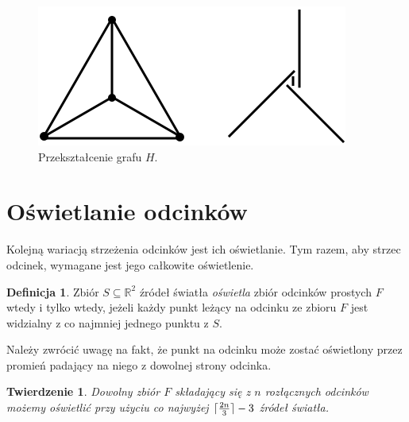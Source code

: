 \documentclass{xmgr}
\DeclarePairedDelimiter\ceil{\lceil}{\rceil}
\newtheorem{Twierdzenie}{Twierdzenie}
\theoremstyle{definition}
\newtheorem{Definicja}{Definicja}
\begin{document}
\begin{figure}[ht!]
 \centering
  \includegraphics{rysunki/dolna_granica.png}
  \caption{Przekształcenie grafu $H$.}
  \label{fig:przeksztalcenie h}
\end{figure} 

\section{Oświetlanie odcinków}\label{oświetlanie odcinków}
Kolejną wariacją strzeżenia odcinków jest ich oświetlanie. Tym razem, aby strzec odcinek, wymagane jest jego całkowite oświetlenie.
\begin{Definicja}
	Zbiór $S \subseteq \mathbb{R}^2$ źródeł światła \emph{oświetla} zbiór odcinków prostych $F$ wtedy i tylko wtedy, jeżeli każdy punkt leżący na odcinku ze zbioru $F$ jest widzialny z co najmniej jednego punktu z $S$.
\end{Definicja} Należy zwrócić uwagę na fakt, że punkt na odcinku może zostać oświetlony przez promień padający na niego z dowolnej strony odcinka.

\begin{Twierdzenie} \cite{illumination}
 Dowolny zbiór $F$ składający się z $n$ rozłącznych odcinków możemy oświetlić przy użyciu co najwyżej $\ceil{\frac{2n}{3}}-3$ źródeł światła.
\end{Twierdzenie}
\end{document}
